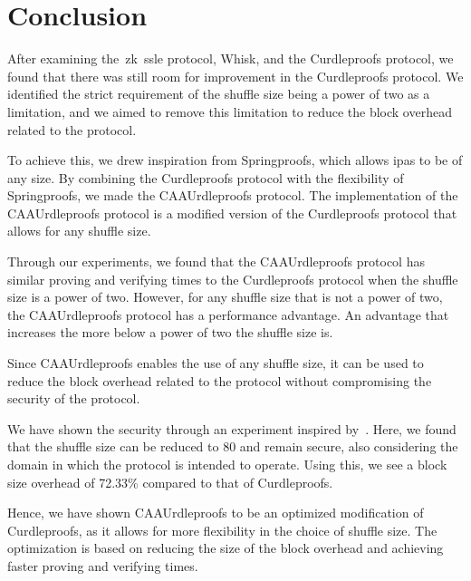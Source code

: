 

\section{Conclusion}\label{sec:conclusion}
After examining the~\gls{zk}~\gls{ssle} protocol, Whisk, and the Curdleproofs protocol, we found that there was still room for improvement in the Curdleproofs protocol.
We identified the strict requirement of the shuffle size being a power of two as a limitation, and we aimed to remove this limitation to reduce the block overhead related to the protocol.

To achieve this, we drew inspiration from Springproofs, which allows \glspl{ipa} to be of any size.
By combining the Curdleproofs protocol with the flexibility of Springproofs, we made the CAAUrdleproofs protocol.
The implementation of the CAAUrdleproofs protocol is a modified version of the Curdleproofs protocol that allows for any shuffle size.

Through our experiments, we found that the CAAUrdleproofs protocol has similar proving and verifying times to the Curdleproofs protocol when the shuffle size is a power of two.
However, for any shuffle size that is not a power of two, the CAAUrdleproofs protocol has a performance advantage.
An advantage that increases the more below a power of two the shuffle size is.

Since CAAUrdleproofs enables the use of any shuffle size, it can be used to reduce the block overhead related to the protocol without compromising the security of the protocol.

We have shown the security through an experiment inspired by~\cite{cryptoeprint:2022/560}.
Here, we found that the shuffle size can be reduced to 80 and remain secure, also considering the domain in which the protocol is intended to operate.
Using this, we see a block size overhead of 72.33\% compared to that of Curdleproofs.
 

Hence, we have shown CAAUrdleproofs to be an optimized modification of Curdleproofs, as it allows for more flexibility in the choice of shuffle size. 
The optimization is based on reducing the size of the block overhead and achieving faster proving and verifying times.
